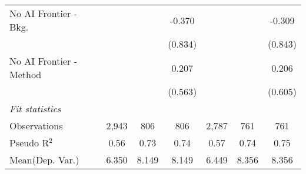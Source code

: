 \begin{tabular}{lcccccc}
   No AI Frontier - Bkg.   &         &            & -0.370       &         &         & -0.309\\   
                           &         &            & (0.834)      &         &         & (0.843)\\   
   No AI Frontier - Method &         &            & 0.207        &         &         & 0.206\\   
                           &         &            & (0.563)      &         &         & (0.605)\\   
   \midrule
   \emph{Fit statistics}\\
   Observations            & 2,943   & 806        & 806          & 2,787   & 761     & 761\\  
   Pseudo R$^2$            & 0.56    & 0.73       & 0.74         & 0.57    & 0.74    & 0.75\\  
Mean(Dep. Var.) & 6.350 & 8.149 & 8.149 & 6.449 & 8.356 & 8.356 \\
   

\end{tabular}
